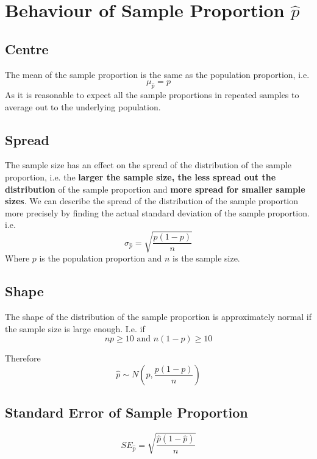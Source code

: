 \documentclass[12pt letter]{report}
\begin{document}
\section{Behaviour of Sample Proportion $\hat{p}$}

\subsection{Centre}

The mean of the sample proportion is the same as the population proportion, i.e.
\[
  \mu_{\hat{p}} = p
\]
As it is reasonable to expect all the sample proportions in repeated samples to average out to the underlying population.

\subsection{Spread}

The sample size has an effect on the spread of the distribution of the sample proportion, i.e. the \textbf{larger the sample
  size, the less spread out the distribution} of the sample proportion and \textbf{more spread for smaller sample
  sizes}. We can describe the spread of the distribution of the sample proportion more precisely by finding the actual
standard deviation of the sample proportion. i.e.
\[
  \sigma_{\hat{p}} = \sqrt{\frac{p \left( 1 - p \right) }{n}}
\]
Where $p$ is the population proportion and $n$ is the sample size.

\subsection{Shape}

The shape of the distribution of the sample proportion is approximately normal if the sample size is large enough. I.e.
if
\[
  np \geq 10 \text{ and } n \left( 1 - p \right) \geq 10
\]

Therefore
\[
  \hat{p} \sim N \left( p, \frac{p \left( 1 - p \right) }{n} \right)
\]


\subsection{Standard Error of Sample Proportion}

\[
  SE_{\hat{p}} = \sqrt{\frac{\hat{p} \left( 1 - \hat{p} \right) }{n}}
\]
\end{document}
